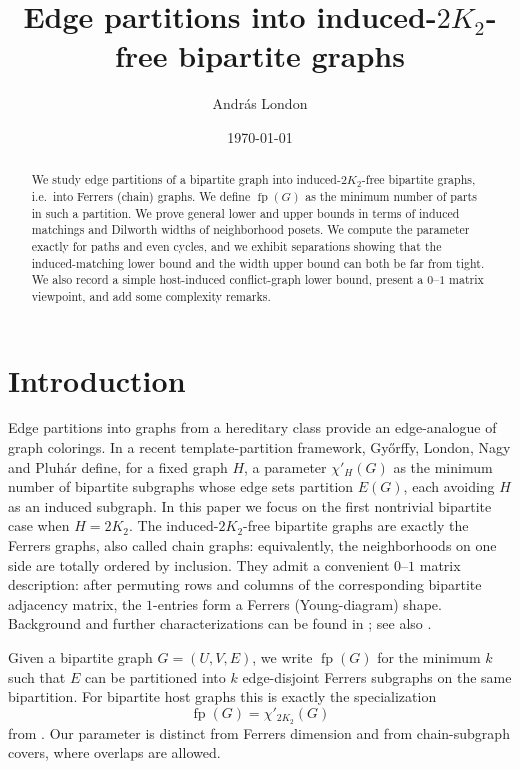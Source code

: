 \documentclass[12pt]{amsart}
\title{Edge partitions into induced-$2K_2$-free bipartite graphs}
\author{András London}
\date{\today}
\newcommand{\fp}{\operatorname{fp}}
\begin{document}
\maketitle

\begin{abstract}
We study edge partitions of a bipartite graph into induced-$2K_2$-free bipartite graphs, i.e.\ into Ferrers (chain) graphs.
We define $\fp(G)$ as the minimum number of parts in such a partition.
We prove general lower and upper bounds in terms of induced matchings and Dilworth widths of neighborhood posets.
We compute the parameter exactly for paths and even cycles, and we exhibit separations showing that the induced-matching lower bound and the width upper bound can both be far from tight.
We also record a simple host-induced conflict-graph lower bound, present a $0$--$1$ matrix viewpoint, and add some complexity remarks.
\end{abstract}

\section{Introduction}

Edge partitions into graphs from a hereditary class provide an edge-analogue of graph colorings.
In a recent template-partition framework, Gy\H{o}rffy, London, Nagy and Pluh\'ar \cite{GyorffyLondonNagyPluhar2025} define, for a fixed graph $H$,
a parameter $\chi'_H(G)$ as the minimum number of bipartite subgraphs whose edge sets partition $E(G)$, each avoiding $H$ as an induced subgraph.
In this paper we focus on the first nontrivial bipartite case when $H=2K_2$.
The induced-$2K_2$-free bipartite graphs are exactly the Ferrers graphs, also called chain graphs:
equivalently, the neighborhoods on one side are totally ordered by inclusion.
They admit a convenient $0$--$1$ matrix description: after permuting rows and columns of the corresponding bipartite adjacency matrix, the $1$-entries form a Ferrers (Young-diagram) shape.
Background and further characterizations can be found in \cite{BrandstadtLeSpinrad}; see also \cite{EhrenborgVW}.

Given a bipartite graph $G=(U,V,E)$, we write $\fp(G)$ for the minimum $k$ such that
$E$ can be partitioned into $k$ edge-disjoint Ferrers subgraphs on the same bipartition.
For bipartite host graphs this is exactly the specialization
\[
\fp(G)=\chi'_{2K_2}(G)
\]
from \cite{GyorffyLondonNagyPluhar2025}.
Our parameter is distinct from Ferrers dimension and from chain-subgraph covers, where overlaps are allowed.
\end{document}
